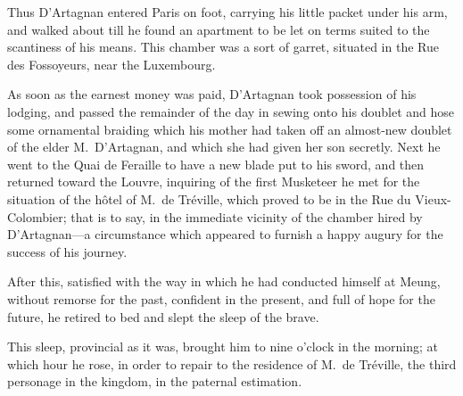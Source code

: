 Thus D'Artagnan entered Paris on foot, carrying his little packet under his arm, and walked about till he found an apartment to be let on terms suited to the scantiness of his means. This chamber was a sort of garret, situated in the Rue des Fossoyeurs, near the Luxembourg. 

As soon as the earnest money was paid, D'Artagnan took possession of his lodging, and passed the remainder of the day in sewing onto his doublet and hose some ornamental braiding which his mother had taken off an almost-new doublet of the elder M.~D'Artagnan, and which she had given her son secretly. Next he went to the Quai de Feraille to have a new blade put to his sword, and then returned toward the Louvre, inquiring of the first Musketeer he met for the situation of the hôtel of M.~de Tréville, which proved to be in the Rue du Vieux-Colombier; that is to say, in the immediate vicinity of the chamber hired by D'Artagnan—a circumstance which appeared to furnish a happy augury for the success of his journey. 

After this, satisfied with the way in which he had conducted himself at Meung, without remorse for the past, confident in the present, and full of hope for the future, he retired to bed and slept the sleep of the brave. 

This sleep, provincial as it was, brought him to nine o'clock in the morning; at which hour he rose, in order to repair to the residence of M.~de Tréville, the third personage in the kingdom, in the paternal estimation.